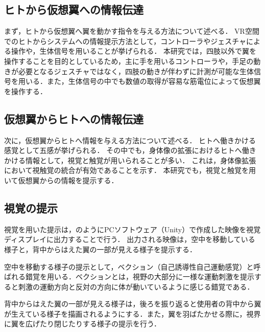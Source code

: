 \begin{small}
  \subsection{ヒトから仮想翼への情報伝達}
    
    まず，ヒトから仮想翼へ翼を動かす指令を与える方法について述べる．
    VR空間でのヒトからシステムへの情報提示方法として，コントローラやジェスチャによる操作や，生体信号を用いることが挙げられる．
    本研究では，四肢以外で翼を操作することを目的としているため，主に手を用いるコントローラや，手足の動きが必要となるジェスチャではなく，四肢の動きが伴わずに計測が可能な生体信号を用いる．また，生体信号の中でも数値の取得が容易な筋電位によって仮想翼を操作する．

  \subsection{仮想翼からヒトへの情報伝達}
    次に，仮想翼からヒトへ情報を与える方法について述べる．
    ヒトへ働きかける感覚として五感が挙げられる．
    その中でも，身体像の拡張におけるヒトへ働きかける情報として，視覚と触覚が用いられることが多い．
    これは，身体像拡張において視触覚の統合が有効であることを示す．
    本研究でも，視覚と触覚を用いて仮想翼からの情報を提示する．
   

    \subsection{視覚の提示} %
      
      視覚を用いた提示は，のようにPCソフトウェア（Unity）で作成した映像を視覚ディスプレイに出力することで行う．
      出力される映像は，空中を移動している様子と，背中からはえた翼の一部が見える様子を提示する．

      空中を移動する様子の提示として，ベクション（自己誘導性自己運動感覚）と呼ばれる錯覚を用いる．ベクションとは，視野の大部分に一様な運動刺激を提示すると刺激の運動方向と反対の方向に体が動いているように感じる錯覚である\cite{bhalla1999visual}．

      背中からはえた翼の一部が見える様子は，後ろを振り返ると使用者の背中から翼が生えている様子を描画されるようにする．また，翼を羽ばたかせる際に，視界に翼を広げたり閉じたりする様子の提示を行う．


\end{small}
